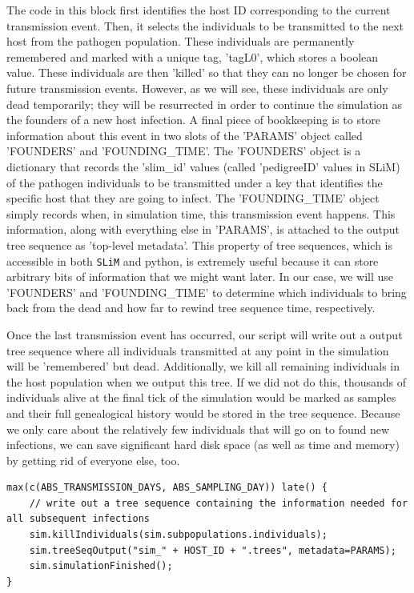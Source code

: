\documentclass[12pt]{article}
\newcommand{\slim}[0]{\texttt{SLiM}\xspace}
\begin{document}
The code in this block first identifies the host ID corresponding to the current transmission event. Then, it selects the individuals to be transmitted to the next host from the
pathogen population. These individuals are permanently remembered and marked with a unique tag, 'tagL0', which stores a boolean value. These individuals are then 'killed'
so that they can no longer be chosen for future transmission events. However, as we will see, these individuals are only dead temporarily; they will be resurrected in order to
continue the simulation as the founders of a new host infection. A final piece of bookkeeping is to store information about this event in two slots of the 'PARAMS' object
called 'FOUNDERS' and 'FOUNDING_TIME'. The 'FOUNDERS' object is a dictionary that records the 'slim_id' values (called 'pedigreeID' values in SLiM) of the pathogen
individuals to be transmitted under a key that identifies the specific host that they are going to infect. The 'FOUNDING_TIME' object simply records when, in simulation time,
this transmission event happens. This information, along with everything else in 'PARAMS', is attached to the output tree sequence as 'top-level metadata'. This property
of tree sequences, which is accessible in both \slim and python, is extremely useful because it can store arbitrary bits of information that we might want later. In our case,
we will use 'FOUNDERS' and 'FOUNDING_TIME' to determine which individuals to bring back from the dead and how far to rewind tree sequence time, respectively.

Once the last transmission event has occurred, our script will write out a output tree sequence where all individuals transmitted at any point in the simulation will be 'remembered'
but dead. Additionally, we kill all remaining individuals in the host population when we output this tree. If we did not do this, thousands of individuals alive at the final tick of
the simulation would be marked as samples and their full genealogical history would be stored in the tree sequence. Because we only care about the relatively few individuals
that will go on to found new infections, we can save significant hard disk space (as well as time and memory) by getting rid of everyone else, too.

\begin{verbatim}
max(c(ABS_TRANSMISSION_DAYS, ABS_SAMPLING_DAY)) late() {
	// write out a tree sequence containing the information needed for all subsequent infections
	sim.killIndividuals(sim.subpopulations.individuals);
	sim.treeSeqOutput("sim_" + HOST_ID + ".trees", metadata=PARAMS);
	sim.simulationFinished();
}
\end{verbatim}
\end{document}
